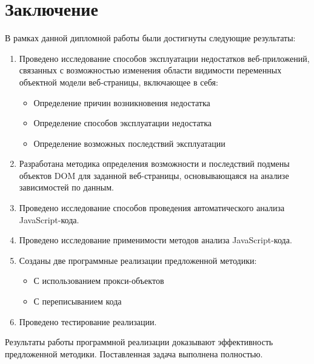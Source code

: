 
\chapter{Заключение}\label{Conclusion}

В рамках данной дипломной работы были достигнуты следующие результаты:

\begin{enumerate}
	\item Проведено исследование способов эксплуатации недостатков веб-приложений, связанных с возможностью изменения области видимости переменных объектной модели веб-страницы, включающее в себя:
		\begin{itemize}
			\item Определение причин возникновения недостатка
			\item Определение способов эксплуатации недостатка
			\item Определение возможных последствий эксплуатации
		\end{itemize}

	\item Разработана методика определения возможности и последствий подмены объектов DOM для заданной веб-страницы, основывающаяся на анализе зависимостей по данным.
	\item Проведено исследование способов проведения автоматического анализа Java\-Script-кода.
	\item Проведено исследование применимости методов анализа JavaScript-кода.
	\item Созданы две программные реализации предложенной методики:
		\begin{itemize}
			\item С использованием прокси-объектов
			\item С переписыванием кода
		\end{itemize}
	\item Проведено тестирование реализации.
\end{enumerate}

Результаты работы программной реализации доказывают эффективность предложенной методики. Поставленная задача выполнена полностью.